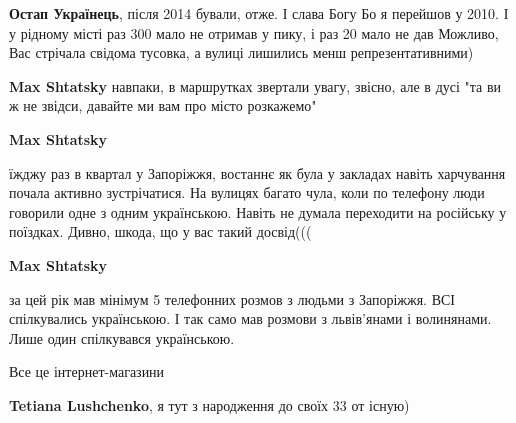 \begin{itemize}
\begin{itemize}
\textbf{Остап Українець}, після 2014 бували, отже.
І слава Богу
Бо я перейшов у 2010. І у рідному місті раз 300 мало не отримав у пику, і раз 20 мало не дав
Можливо, Вас стрічала свідома тусовка, а вулиці лишились менш репрезентативними)


 
\textbf{Max Shtatsky} навпаки, в маршрутках звертали увагу, звісно, але в дусі "та ви ж не звідси, давайте ми вам про місто розкажемо"

 
\textbf{Max Shtatsky} 

їжджу раз в квартал у Запоріжжя, востаннє як була у закладах навіть харчування
почала активно зустрічатися. На вулицях багато чула, коли по телефону люди
говорили одне з одним українською. Навіть не думала переходити на російську у
поїздках. Дивно, шкода, що у вас такий досвід(((


 
\textbf{Max Shtatsky} 

за цей рік мав мінімум 5 телефонних розмов з людьми з Запоріжжя. ВСІ
спілкувались українською. І так само мав розмови з львів'янами і волинянами.
Лише один спілкувався українською.

Все це інтернет-магазини


 
\textbf{Tetiana Lushchenko}, я тут з народження до своїх 33 от існую)

 

\end{itemize}
\end{itemize}
